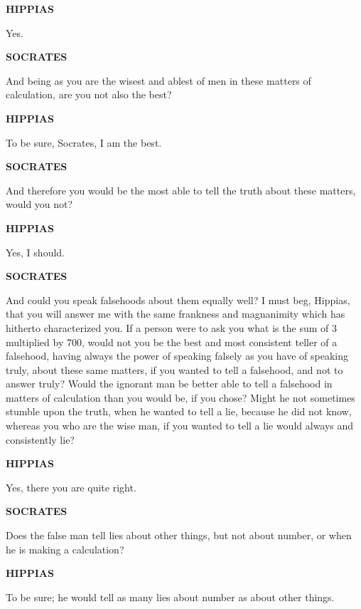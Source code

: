 \documentclass[11pt,letter]{article}
\begin{document}
\par \textbf{HIPPIAS}
\par   Yes.

\par \textbf{SOCRATES}
\par   And being as you are the wisest and ablest of men in these matters of calculation, are you not also the best?

\par \textbf{HIPPIAS}
\par   To be sure, Socrates, I am the best.

\par \textbf{SOCRATES}
\par   And therefore you would be the most able to tell the truth about these matters, would you not?

\par \textbf{HIPPIAS}
\par   Yes, I should.

\par \textbf{SOCRATES}
\par   And could you speak falsehoods about them equally well? I must beg, Hippias, that you will answer me with the same frankness and magnanimity which has hitherto characterized you. If a person were to ask you what is the sum of 3 multiplied by 700, would not you be the best and most consistent teller of a falsehood, having always the power of speaking falsely as you have of speaking truly, about these same matters, if you wanted to tell a falsehood, and not to answer truly? Would the ignorant man be better able to tell a falsehood in matters of calculation than you would be, if you chose? Might he not sometimes stumble upon the truth, when he wanted to tell a lie, because he did not know, whereas you who are the wise man, if you wanted to tell a lie would always and consistently lie?

\par \textbf{HIPPIAS}
\par   Yes, there you are quite right.

\par \textbf{SOCRATES}
\par   Does the false man tell lies about other things, but not about number, or when he is making a calculation?

\par \textbf{HIPPIAS}
\par   To be sure; he would tell as many lies about number as about other things.
\end{document}
